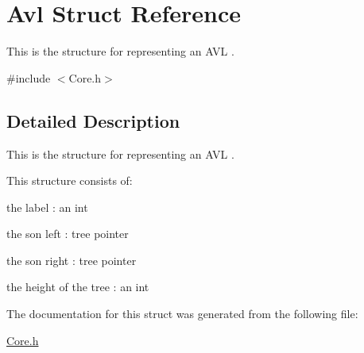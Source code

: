 \hypertarget{structAvl}{\section{Avl Struct Reference}
\label{structAvl}
}


This is the structure for representing an A\-V\-L .  




{\ttfamily \#include $<$Core.\-h$>$}



\subsection{Detailed Description}
This is the structure for representing an A\-V\-L . 

This structure consists of\-:
\begin{DoxyItemize}
\item the label \-: an int
\item the son left \-: tree pointer
\item the son right \-: tree pointer
\item the height of the tree \-: an int 
\end{DoxyItemize}

The documentation for this struct was generated from the following file\-:\begin{DoxyCompactItemize}
\item 
\hyperlink{Core_8h}{Core.\-h}\end{DoxyCompactItemize}
